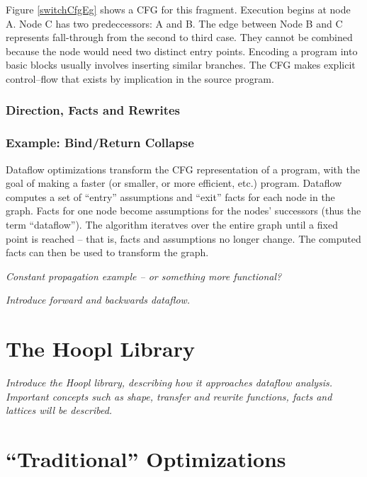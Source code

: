 \documentclass[12pt]{report}
\begin{document}
Figure \ref{switchCfgEg} shows a CFG for this fragment. Execution
begins at node A. Node C has two predeccessors: A and B. The edge
between Node B and C represents fall-through from the second to third
case. They cannot be combined because the node would need two distinct
entry points. Encoding a program into basic blocks usually involves
inserting similar branches. The CFG makes explicit control--flow that
exists by implication in the source program.

\subsection{Direction, Facts and Rewrites}

\subsection{Example: Bind/Return Collapse}

Dataflow optimizations transform the CFG representation of a program,
with the goal of making a faster (or smaller, or more efficient, etc.)
program. Dataflow computes a set of ``entry'' assumptions and ``exit''
facts for each node in the graph. Facts for one node become
assumptions for the nodes' successors (thus the term
``dataflow''). The algorithm iteratves over the entire graph until a
fixed point is reached -- that is, facts and assumptions no longer
change. The computed facts can then be used to transform the graph.

\emph{Constant propagation example -- or something more functional?}

\emph{Introduce forward and backwards dataflow.}




\chapter{The Hoopl Library}

\emph{Introduce the Hoopl library, describing how
it approaches dataflow analysis. Important concepts
such as shape, transfer and rewrite functions, facts and
lattices will be described. }



\chapter{``Traditional'' Optimizations}
\end{document}
